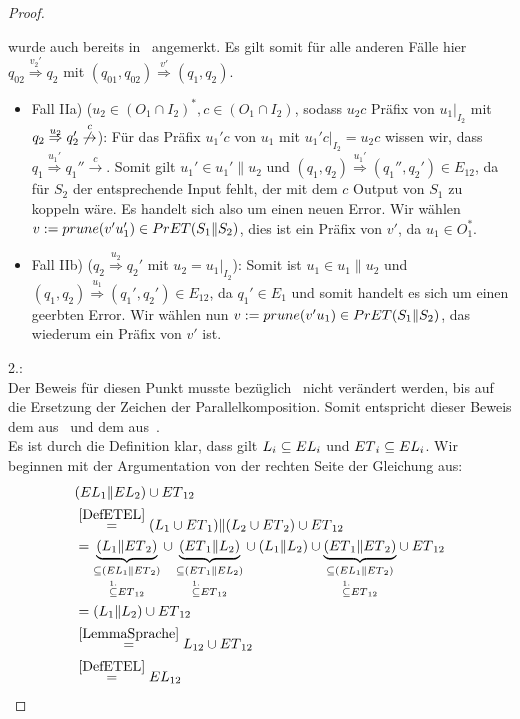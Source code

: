 \begin{proof}
\begin{itemize}
    wurde auch bereits in~\cite{Schlosser2012BA} angemerkt. Es gilt somit für
    alle anderen Fälle hier $q_{02} \overset{v_2'}{\Rightarrow}q_2$ mit
    $(q_{01},q_{02}) \overset{v'}{\Rightarrow}(q_1,q_2)$.
    \begin{itemize}
      \item Fall IIa) ($u_2\in (O_1\cap I_2)^*, c\in (O_1\cap I_2)$, sodass
        $u_2c$ Präfix von $u_1|_{I_2}$ mit $q_2 \overset{u_2}{\Rightarrow} q_2'
        \overset{c}{\not{\hspace{-0.1cm}\rightarrow}}$): Für das Präfix $u_1'c$
        von $u_1$ mit $u_1'c|_{I_2}=u_2c$ wissen wir, dass $q_1
        \overset{u_1'}{\Rightarrow} q_1'' \overset{c}{\rightarrow}$. Somit gilt
        $u_1'\in u_1'\|u_2$ und $(q_1,q_2) \overset{u_1'}{\Rightarrow}
        (q_1'',q_2')\in E_{12}$, da für $S_2$ der entsprechende Input fehlt,
        der mit dem $c$ Output von $S_1$ zu koppeln wäre. Es handelt sich also
        um einen neuen Error. Wir wählen $v:=prune{}(v'u_1')\in PrET{}(S_1\| S_2)$,
        dies ist ein Präfix von $v'$, da $u_1\in O_1^*$.
      \item Fall IIb) ($q_2 \overset{u_2}{\Rightarrow} q_2'$ mit
        $u_2=u_1|_{I_2}$): Somit ist $u_1\in u_1\|u_2$ und $(q_1,q_2)
        \overset{u_1}{\Rightarrow} (q_1',q_2')\in E_{12}$, da $q_1'\in E_1$ und
        somit handelt es sich um einen geerbten Error. Wir wählen nun $v:=prune{}
        (v'u_1)\in PrET{}(S_1\|S_2)$, das wiederum ein Präfix von $v'$ ist.
    \end{itemize}
  \end{itemize}

  2.:\\
  Der Beweis für diesen Punkt musste bezüglich~\cite{Vogler2014EIO} nicht
  verändert werden, bis auf die Ersetzung der Zeichen der Parallelkomposition.
  Somit entspricht dieser Beweis dem aus~\cite{Vogler2014EIO} und dem
  aus~\cite{Schlosser2012BA}.\\
  Es ist durch die Definition klar, dass gilt $L_i\subseteq EL{}_i$ und
  $ET{}_i\subseteq EL{}_i$. Wir beginnen mit der Argumentation von der rechten
  Seite der Gleichung aus:
  \begin{align*}
    &(EL{}_1\| EL{}_2)\cup ET{}_{12}\\
    &\overset{\ref{DefETEL}}{=}(L_1\cup ET{}_1)\|(L_2\cup ET{}_2)\cup ET{}_{12}\\
    &=\underset{\overset{1.}{\subseteq} ET{}_{12}}{\underset{\subseteq
    (EL{}_1\|ET{}_2)}{\underbrace{(L_1\|ET{}_2)}}} \cup
    \underset{\overset{1.}{\subseteq} ET{}_{12}}{\underset{\subseteq
    (ET{}_1\|EL{}_2)}{\underbrace{(ET{}_1\|L_2)}}} \cup
    (L_1\|L_2) \cup \underset{\overset{1.}{\subseteq}
    ET{}_{12}}{\underset{\subseteq (EL{}_1\|ET{}_2)}{\underbrace{(ET{}_1\|ET{}_2)}}} \cup
    ET{}_{12}\\
    &=(L_1\|L_2) \cup ET{}_{12}\\
    &\overset{\ref{LemmaSprache}}{=}L_{12}\cup ET{}_{12}\\
    &\overset{\ref{DefETEL}}{=}EL{}_{12}
  \end{align*}
\end{proof}

